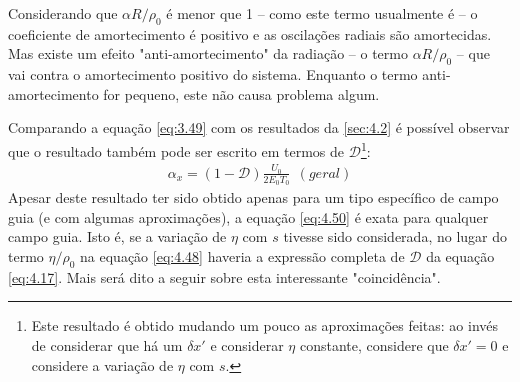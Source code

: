 Considerando que $\alpha R/\rho_0$ é menor que 1 -- como este termo usualmente é -- o coeficiente de amortecimento é positivo e as oscilações radiais são amortecidas. Mas existe um efeito "anti-amortecimento" da radiação -- o termo $\alpha R/\rho_0$ -- que vai contra o amortecimento positivo do sistema. Enquanto o termo anti-amortecimento for pequeno, este não causa problema algum.

Comparando a equação \eqref{eq:3.49} com os resultados da \autoref{sec:4.2} é possível observar que o resultado também pode ser escrito em termos de $\mathscr{D}$\footnote{Este resultado é obtido mudando um pouco as aproximações feitas: ao invés de considerar que há um $\delta x'$ e considerar $\eta$ constante, considere que $\delta x'=0$ e considere a variação de $\eta$ com $s$.}:
\begin{align}
	\alpha_x = (1-\mathscr{D})\frac{U_0}{2E_0T_0}\ \ (geral)\label{eq:4.50}
\end{align}
Apesar deste resultado ter sido obtido apenas para um tipo específico de campo guia (e com algumas aproximações), a equação \eqref{eq:4.50} é exata para qualquer campo guia. Isto é, se a variação de $\eta$ com $s$ tivesse sido considerada, no lugar do termo $\eta/\rho_0$ na equação \eqref{eq:4.48} haveria a expressão completa de $\mathscr{D}$ da equação \eqref{eq:4.17}. Mais será dito a seguir sobre esta interessante "coincidência".